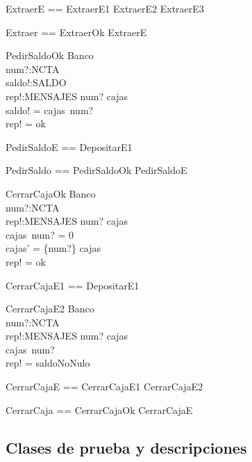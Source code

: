 \begin{zed}
ExtraerE == ExtraerE1 \lor ExtraerE2 \lor ExtraerE3 \also

Extraer == ExtraerOk \lor ExtraerE
\end{zed}

\begin{schema}{PedirSaldoOk}
\Xi Banco \\
num?:NCTA \\
saldo!:SALDO \\
rep!:MENSAJES
\where
num? \in \dom cajas \\
saldo! = cajas~num? \\
rep! = ok
\end{schema}

\begin{zed}
PedirSaldoE == DepositarE1 \also

PedirSaldo == PedirSaldoOk \lor PedirSaldoE
\end{zed}

\begin{schema}{CerrarCajaOk}
\Delta Banco \\
num?:NCTA \\
rep!:MENSAJES
\where
num? \in \dom cajas \\
cajas~num? = 0 \\
cajas' = \{num?\} \ndres cajas \\
rep! = ok
\end{schema}

\begin{zed}
CerrarCajaE1 == DepositarE1
\end{zed}

\begin{schema}{CerrarCajaE2}
\Xi Banco \\
num?:NCTA \\
rep!:MENSAJES
\where
num? \in \dom cajas \\
cajas~num?  \\
rep! = saldoNoNulo
\end{schema} 

\begin{zed}
CerrarCajaE == CerrarCajaE1 \lor CerrarCajaE2 \also

CerrarCaja == CerrarCajaOk \lor CerrarCajaE \\
\end{zed}


\subsection*{Clases de prueba y descripciones}

